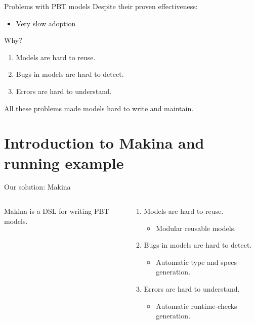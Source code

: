 \documentclass[aspectratio=169, 10pt, handout]{beamer}
\begin{document}
\begin{frame}[label={sec:org851b2a8}]{Problems with PBT models}
\onslide<+->
\onslide<+->
Despite their proven effectiveness:
\begin{itemize}
\item Very slow adoption
\end{itemize}

\vspace{10pt}
\onslide<+->
Why?

\vspace{10pt}

\begin{enumerate}
\item Models are hard to reuse.
\item Bugs in models are hard to detect.
\item Errors are hard to understand.
\end{enumerate}
\onslide<+->
\vspace{10pt}

All these problems made models hard to write and maintain.
\end{frame}

\section{Introduction to Makina and running example}
\label{sec:orge9c4ec2}
\begin{frame}[label={sec:orgc4273dd}]{Our solution: Makina}
\begin{columns}
\begin{column}{0.48\columnwidth}
Makina is a DSL for writing PBT models.
\onslide<+->

\vspace{10pt}
\end{column}

\begin{column}{0.48\columnwidth}
\begin{enumerate}
\item Models are hard to reuse.
\begin{itemize}
\item Modular reusable models. \vspace{10pt}
\end{itemize}
\item Bugs in models are hard to detect.
\begin{itemize}
\item Automatic type and specs generation. \vspace{10pt}
\end{itemize}
\item Errors are hard to understand.
\begin{itemize}
\item Automatic runtime-checks generation. \vspace{10pt}
\end{itemize}
\end{enumerate}
\end{column}
\end{columns}
\end{frame}
\end{document}
